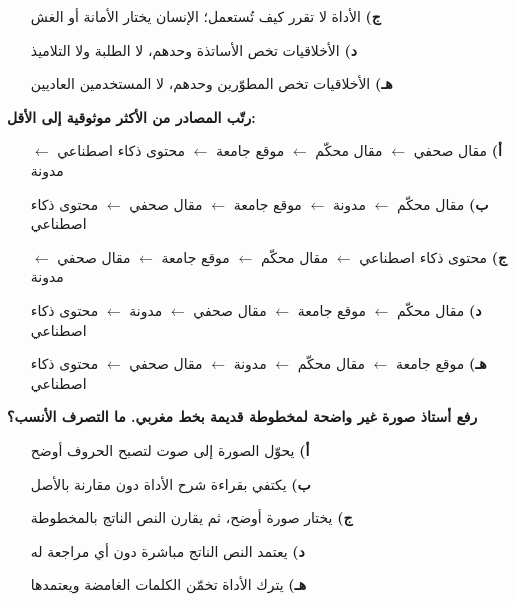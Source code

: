 \documentclass[11pt,a4paper]{article}
\begin{document}
\begin{multicols}{2}
\begin{minipage}{\linewidth}
\begin{itemize}[leftmargin=0.95cm, labelsep=4pt, itemsep=0pt, topsep=2pt, parsep=0pt]
  \item[\textbf{ج)}] الأداة لا تقرر كيف تُستعمل؛ الإنسان يختار الأمانة أو الغش
  \item[\textbf{د)}] الأخلاقيات تخص الأساتذة وحدهم، لا الطلبة ولا التلاميذ
  \item[\textbf{هـ)}] الأخلاقيات تخص المطوّرين وحدهم، لا المستخدمين العاديين
\end{itemize}
\end{minipage}\par\vspace{7pt plus 4pt}
\noindent\begin{minipage}{\linewidth}
\hangindent=0.7cm\textbf{رتّب المصادر من الأكثر موثوقية إلى الأقل:}
\begin{itemize}[leftmargin=0.95cm, labelsep=4pt, itemsep=0pt, topsep=2pt, parsep=0pt]
  \item[\textbf{أ)}] مقال صحفي $\leftarrow$ مقال محكّم $\leftarrow$ موقع جامعة $\leftarrow$ محتوى ذكاء اصطناعي $\leftarrow$ مدونة
  \item[\textbf{ب)}] مقال محكّم $\leftarrow$ مدونة $\leftarrow$ موقع جامعة $\leftarrow$ مقال صحفي $\leftarrow$ محتوى ذكاء اصطناعي
  \item[\textbf{ج)}] محتوى ذكاء اصطناعي $\leftarrow$ مقال محكّم $\leftarrow$ موقع جامعة $\leftarrow$ مقال صحفي $\leftarrow$ مدونة
  \item[\textbf{د)}] مقال محكّم $\leftarrow$ موقع جامعة $\leftarrow$ مقال صحفي $\leftarrow$ مدونة $\leftarrow$ محتوى ذكاء اصطناعي
  \item[\textbf{هـ)}] موقع جامعة $\leftarrow$ مقال محكّم $\leftarrow$ مدونة $\leftarrow$ مقال صحفي $\leftarrow$ محتوى ذكاء اصطناعي
\end{itemize}
\end{minipage}\par\vspace{7pt plus 4pt}
\noindent\begin{minipage}{\linewidth}
\hangindent=0.7cm\textbf{رفع أستاذ صورة غير واضحة لمخطوطة قديمة بخط مغربي. ما التصرف الأنسب؟}
\begin{itemize}[leftmargin=0.95cm, labelsep=4pt, itemsep=0pt, topsep=2pt, parsep=0pt]
  \item[\textbf{أ)}] يحوّل الصورة إلى صوت لتصبح الحروف أوضح
  \item[\textbf{ب)}] يكتفي بقراءة شرح الأداة دون مقارنة بالأصل
  \item[\textbf{ج)}] يختار صورة أوضح، ثم يقارن النص الناتج بالمخطوطة
  \item[\textbf{د)}] يعتمد النص الناتج مباشرة دون أي مراجعة له
  \item[\textbf{هـ)}] يترك الأداة تخمّن الكلمات الغامضة ويعتمدها
\end{itemize}
\end{minipage}\par\vspace{7pt plus 4pt}
\end{multicols}
\end{document}
